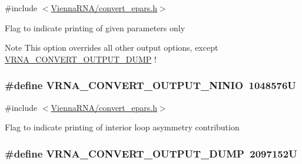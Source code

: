 {\ttfamily \#include $<$\hyperlink{convert__epars_8h}{Vienna\+R\+N\+A/convert\+\_\+epars.\+h}$>$}

Flag to indicate printing of given parameters only~\newline
\begin{DoxyNote}{Note}
This option overrides all other output options, except \hyperlink{group__energy__parameters__convert_gac86976e9c2a55b3a6481ea60044f6098}{V\+R\+N\+A\+\_\+\+C\+O\+N\+V\+E\+R\+T\+\_\+\+O\+U\+T\+P\+U\+T\+\_\+\+D\+U\+MP} ! 
\end{DoxyNote}
\subsubsection[{\texorpdfstring{V\+R\+N\+A\+\_\+\+C\+O\+N\+V\+E\+R\+T\+\_\+\+O\+U\+T\+P\+U\+T\+\_\+\+N\+I\+N\+IO}{VRNA_CONVERT_OUTPUT_NINIO}}]{\setlength{\rightskip}{0pt plus 5cm}\#define V\+R\+N\+A\+\_\+\+C\+O\+N\+V\+E\+R\+T\+\_\+\+O\+U\+T\+P\+U\+T\+\_\+\+N\+I\+N\+IO~1048576U}\hypertarget{group__energy__parameters__convert_ga2eb0462f16939ddacdaf751a88d675ce}{}\label{group__energy__parameters__convert_ga2eb0462f16939ddacdaf751a88d675ce}


{\ttfamily \#include $<$\hyperlink{convert__epars_8h}{Vienna\+R\+N\+A/convert\+\_\+epars.\+h}$>$}

Flag to indicate printing of interior loop asymmetry contribution 
\subsubsection[{\texorpdfstring{V\+R\+N\+A\+\_\+\+C\+O\+N\+V\+E\+R\+T\+\_\+\+O\+U\+T\+P\+U\+T\+\_\+\+D\+U\+MP}{VRNA_CONVERT_OUTPUT_DUMP}}]{\setlength{\rightskip}{0pt plus 5cm}\#define V\+R\+N\+A\+\_\+\+C\+O\+N\+V\+E\+R\+T\+\_\+\+O\+U\+T\+P\+U\+T\+\_\+\+D\+U\+MP~2097152U}\hypertarget{group__energy__parameters__convert_gac86976e9c2a55b3a6481ea60044f6098}{}\label{group__energy__parameters__convert_gac86976e9c2a55b3a6481ea60044f6098}


